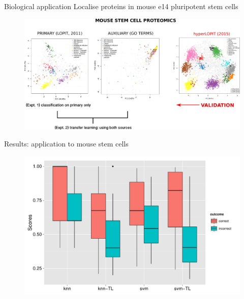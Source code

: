 \documentclass[bigger]{beamer}
\begin{document}
\begin{frame}{Biological application}
Localise proteins in mouse e14 pluripotent stem cells
    
  \begin{figure}
    \includegraphics[width=1\linewidth]{Figures/old-new2.pdf}
  \end{figure}
\end{frame}





\begin{frame}{Results: application to mouse stem cells}
  \begin{figure}
    \includegraphics[width=.9\linewidth]{Figures/classifierDiscriminationPowerk5.pdf}
  \end{figure}
\end{frame}
\end{document}
